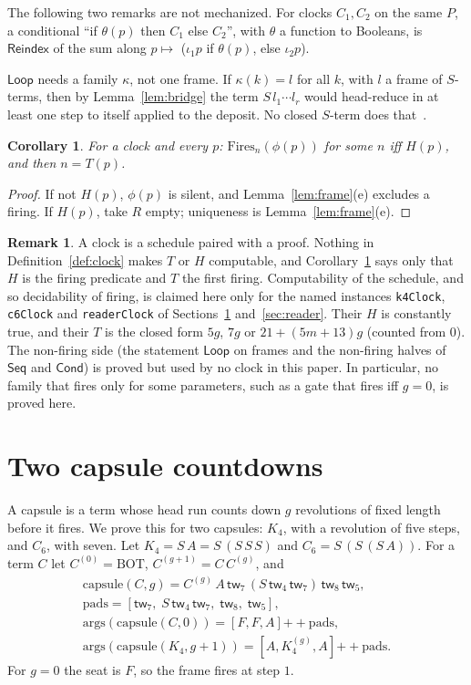 \documentclass[11pt]{amsart}
\newtheorem{corollary}[theorem]{Corollary}
\theoremstyle{definition}
\newtheorem{remark}[theorem]{Remark}
\newcommand{\app}{\mathbin{+\!\!+}}
\newcommand{\args}{\mathrm{args}}
\newcommand{\tw}[1]{\mathsf{tw}_{#1}}
\newcommand{\Fires}{\mathrm{Fires}}
\newcommand{\BOT}{\mathrm{BOT}}
\newcommand{\cps}{\mathrm{capsule}}
\newcommand{\pads}{\mathrm{pads}}
\newcommand{\lean}[1]{\texttt{#1}}
\newcommand{\Seq}{\mathsf{Seq}}
\newcommand{\Loop}{\mathsf{Loop}}
\newcommand{\Cond}{\mathsf{Cond}}
\newcommand{\Reindex}{\mathsf{Reindex}}
\begin{document}
The following two remarks are not mechanized. For clocks $C_1,C_2$ on the same $P$, a
conditional ``if $\theta(p)$ then $C_1$ else $C_2$'', with $\theta$ a function to Booleans, is
$\Reindex$ of the sum along $p\mapsto$ ($\iota_1 p$ if $\theta(p)$, else $\iota_2 p$).

$\Loop$ needs a family $\kappa$, not one frame. If $\kappa(k)=l$ for all $k$, with $l$ a frame of
$S$-terms, then by Lemma~\ref{lem:bridge} the term $S\,l_1\cdots l_r$ would head-reduce in at least
one step to itself applied to the deposit. No closed $S$-term does that~\citep[Corollary~2]{s7}.

\begin{corollary}\label{cor:iff}
For a clock and every $p$: $\Fires_n(\phi(p))$ for some $n$ iff $H(p)$, and then $n=T(p)$.
\end{corollary}

\begin{proof}
If not $H(p)$, $\phi(p)$ is silent, and Lemma~\ref{lem:frame}(e) excludes a firing. If $H(p)$, take
$R$ empty; uniqueness is Lemma~\ref{lem:frame}(e).
\end{proof}

\begin{remark}\label{rem:scope}
A clock is a schedule paired with a proof. Nothing in Definition~\ref{def:clock} makes $T$ or $H$
computable, and Corollary~\ref{cor:iff} says only that $H$ is the firing predicate and $T$ the
first firing. Computability of the schedule, and so decidability of firing, is claimed here only
for the named instances \lean{k4Clock}, \lean{c6Clock} and \lean{readerClock} of
Sections~\ref{sec:capsules} and~\ref{sec:reader}. Their $H$ is constantly true, and their $T$ is
the closed form $5g$, $7g$ or $21+(5m+13)g$ (counted from $0$). The non-firing side (the statement
$\Loop$ on frames and the non-firing halves of $\Seq$ and $\Cond$) is proved but used by no clock
in this paper. In particular, no family that fires only for some parameters, such as a gate that
fires iff $g=0$, is proved here.
\end{remark}

\section{Two capsule countdowns}\label{sec:capsules}

A capsule is a term whose head run counts down $g$ revolutions of fixed length before it fires.
We prove this for two capsules: $K_4$, with a revolution of five steps, and $C_6$, with seven.
Let $K_4=S\,A=S\,(S\,S\,S)$ and $C_6=S\,(S\,(S\,A))$. For a term $C$ let $C^{(0)}=\BOT$,
$C^{(g+1)}=C\,C^{(g)}$, and
\begin{gather*}
\cps(C,g)=C^{(g)}\,A\,\tw7\,(S\,\tw4\,\tw7)\,\tw8\,\tw5,\\
\pads=[\tw7,\;S\,\tw4\,\tw7,\;\tw8,\;\tw5],\\
\args(\cps(C,0))=[F,F,A]\app\pads,\\
\args(\cps(K_4,g+1))=[A,K_4^{(g)},A]\app\pads.
\end{gather*}
For $g=0$ the seat is $F$, so the frame fires at step $1$.
\end{document}
